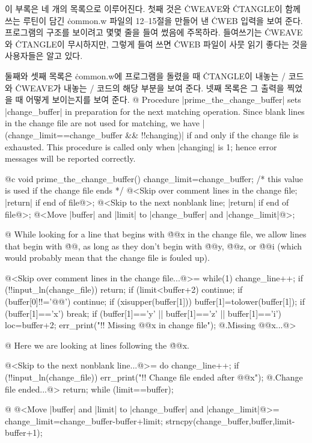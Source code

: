 {이 부록은 네 개의 목록으로 이루어진다. 첫째 것은 \.{CWEAVE}와 \.{CTANGLE}이 함께
쓰는 루틴이 담긴 \.{common.w} 파일의 12--15절을 만들어 낸 \.{CWEB} 입력을 보여
준다. 프로그램의 구조를 보이려고 몇몇 줄을 들여 썼음에 주목하라. 들여쓰기는
\.{CWEAVE}와 \.{CTANGLE}이 무시하지만, 그렇게 들여 쓰면 \.{CWEB} 파일이 사뭇 읽기
좋다는 것을 사용자들은 알고 있다.

둘째와 셋째 목록은 \.{common.w}에 프로그램을 돌렸을 때 \.{CTANGLE}이 내놓는 \CEE/
코드와 \.{CWEAVE}가 내놓는 \TEX/ 코드의 해당 부분을 보여 준다. 넷째 목록은 그
출력을 찍었을 때 어떻게 보이는지를 보여 준다.
\vskip 6pt
\begingroup \def\tt{\eighttt} \baselineskip9pt
\verbatim
@ Procedure |prime_the_change_buffer|
sets |change_buffer| in preparation for the next matching operation.
Since blank lines in the change file are not used for matching, we have
|(change_limit==change_buffer && !!changing)| if and only if
the change file is exhausted. This procedure is called only when
|changing| is 1; hence error messages will be reported correctly.

@c
void
prime_the_change_buffer()
{
  change_limit=change_buffer; /* this value is used if the change file ends */
  @<Skip over comment lines in the change file; |return| if end of file@>;
  @<Skip to the next nonblank line; |return| if end of file@>;
  @<Move |buffer| and |limit| to |change_buffer| and |change_limit|@>;
}

@ While looking for a line that begins with \.{@@x} in the change file, we
allow lines that begin with \.{@@}, as long as they don't begin with \.{@@y},
\.{@@z}, or \.{@@i} (which would probably mean that the change file is fouled up).

@<Skip over comment lines in the change file...@>=
while(1) {
  change_line++;
  if (!!input_ln(change_file)) return;
  if (limit<buffer+2) continue;
  if (buffer[0]!!='@@') continue;
  if (xisupper(buffer[1])) buffer[1]=tolower(buffer[1]);
  if (buffer[1]=='x') break;
  if (buffer[1]=='y' || buffer[1]=='z' || buffer[1]=='i') {
    loc=buffer+2;
    err_print("!! Missing @@x in change file");
@.Missing @@x...@>
  }
}

@ Here we are looking at lines following the \.{@@x}.

@<Skip to the next nonblank line...@>=
do {
  change_line++;
  if (!!input_ln(change_file)) {
    err_print("!! Change file ended after @@x");
@.Change file ended...@>
    return;
  }
} while (limit==buffer);

@ @<Move |buffer| and |limit| to |change_buffer| and |change_limit|@>=
{
  change_limit=change_buffer-buffer+limit;
  strncpy(change_buffer,buffer,limit-buffer+1);
}

}
